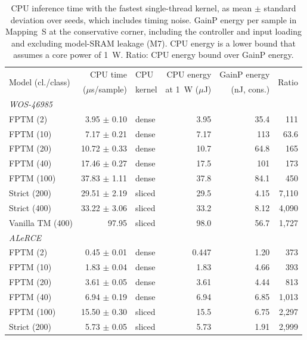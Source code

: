 \documentclass[preprint,12pt]{elsarticle}
\newcommand{\gainp}{GainP}
\newcommand{\hyp}[1]{#1}
\begin{document}
\begin{table}[H]
\footnotesize
\setlength{\tabcolsep}{4pt}
\centering
\caption{CPU inference time with the fastest single-thread kernel, as mean $\pm$ standard deviation over seeds, which includes timing noise. \gainp{} energy per sample in Mapping~S at the conservative corner, including the controller and input loading and excluding model-SRAM leakage (M7). CPU energy is a lower bound that assumes a core power of 1~W. Ratio: CPU energy bound over \gainp{} energy.}
\label{tab:cpu}
\begin{tabular}{lrlrrr}
\toprule
\multirow{2}{*}{Model (cl./class)} & CPU time & CPU & CPU energy & \gainp{} energy & \multirow{2}{*}{Ratio} \\
 & ($\mu$s/sample) & kernel & at 1~W ($\mu$J) & (nJ, cons.) & \\
\midrule
\multicolumn{6}{l}{\textit{WOS-46985}} \\
FPTM (2) & 3.95 $\pm$ 0.10 & dense & \hyp{3.95} & \hyp{35.4} & \hyp{111} \\
FPTM (10) & 7.17 $\pm$ 0.21 & dense & \hyp{7.17} & \hyp{113} & \hyp{63.6} \\
FPTM (20) & 10.72 $\pm$ 0.33 & dense & \hyp{10.7} & \hyp{64.8} & \hyp{165} \\
FPTM (40) & 17.46 $\pm$ 0.27 & dense & \hyp{17.5} & \hyp{101} & \hyp{173} \\
FPTM (100) & 37.83 $\pm$ 1.11 & dense & \hyp{37.8} & \hyp{84.1} & \hyp{450} \\
Strict (200) & 29.51 $\pm$ 2.19 & sliced & \hyp{29.5} & \hyp{4.15} & \hyp{7,110} \\
Strict (400) & 33.22 $\pm$ 3.06 & sliced & \hyp{33.2} & \hyp{8.12} & \hyp{4,090} \\
Vanilla TM (400) & 97.95 & sliced & \hyp{98.0} & \hyp{56.7} & \hyp{1,727} \\
\midrule
\multicolumn{6}{l}{\textit{ALeRCE}} \\
FPTM (2) & 0.45 $\pm$ 0.01 & dense & \hyp{0.447} & \hyp{1.20} & \hyp{373} \\
FPTM (10) & 1.83 $\pm$ 0.04 & dense & \hyp{1.83} & \hyp{4.66} & \hyp{393} \\
FPTM (20) & 3.61 $\pm$ 0.05 & dense & \hyp{3.61} & \hyp{4.44} & \hyp{813} \\
FPTM (40) & 6.94 $\pm$ 0.19 & dense & \hyp{6.94} & \hyp{6.85} & \hyp{1,013} \\
FPTM (100) & 15.50 $\pm$ 0.30 & sliced & \hyp{15.5} & \hyp{6.75} & \hyp{2,297} \\
Strict (200) & 5.73 $\pm$ 0.05 & sliced & \hyp{5.73} & \hyp{1.91} & \hyp{2,999} \\

\end{tabular}
\end{table}
\end{document}
